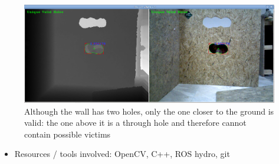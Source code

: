 \begin{figure}[H]\centering
  \includegraphics[scale=0.35]{images/unique_holes.png}
  \caption{\small Although the wall has two holes, only the one closer to the
           ground is valid: the one above it is a through hole and
           therefore cannot contain possible victims}
  \label{fig:holes}
\end{figure}

\begin{itemize}
  \item Resources / tools involved: OpenCV, C++, ROS hydro, git
\end{itemize}
